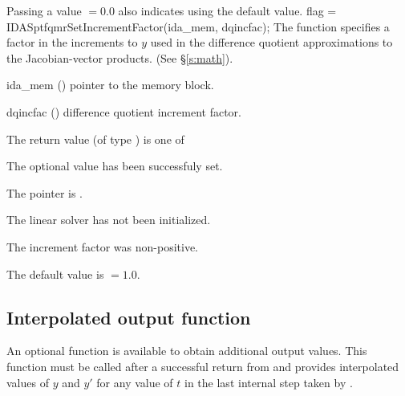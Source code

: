 {{  Passing a value $ = 0.0$ also indicates using the default value.
}
{
  flag = IDASptfqmrSetIncrementFactor(ida\_mem, dqincfac);
}
{
  The function  specifies a factor in the 
  increments to $y$ used in the difference quotient approximations 
  to the Jacobian-vector products.  (See \S\ref{s:math}).
}
{
  \begin{args}[dqincfac]
  \item[ida\_mem] ()
    pointer to the {\ida} memory block.
  \item[dqincfac] ()
    difference quotient increment factor.
  \end{args}
}
{
  The return value  (of type ) is one of
  \begin{args}
  \item[\Id{IDASPTFQMR\_SUCCESS}] 
    The optional value has been successfuly set.
  \item[\Id{IDASPTFQMR\_MEM\_NULL}]
    The  pointer is .
  \item[\Id{IDASPTFQMR\_LMEM\_NULL}]
    The {\idasptfqmr} linear solver has not been initialized.
  \item[\Id{IDASPTFQMR\_ILL\_INPUT}]
    The increment factor was non-positive.
  \end{args}
}
{
  The default value is  $=1.0$.
}


\subsection{Interpolated output function}\label{ss:optional_dky}

An optional function  is available to obtain additional output
values.  This function must be called after a successful return from 
and provides interpolated values of $y$ and $y'$ for any value of $t$ in the last
internal step taken by {\ida}.

}
